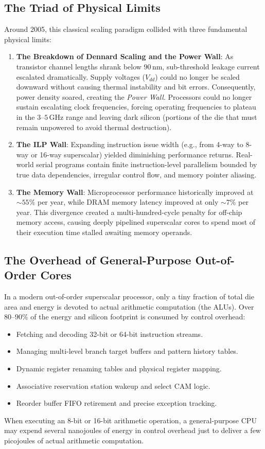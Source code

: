 \subsection{The Triad of Physical Limits}
Around 2005, this classical scaling paradigm collided with three fundamental physical limits:
\begin{enumerate}
    \item \textbf{The Breakdown of Dennard Scaling and the Power Wall}: As transistor channel lengths shrank below $90\,\text{nm}$, sub-threshold leakage current escalated dramatically. Supply voltages ($V_{dd}$) could no longer be scaled downward without causing thermal instability and bit errors. Consequently, power density soared, creating the \emph{Power Wall}. Processors could no longer sustain escalating clock frequencies, forcing operating frequencies to plateau in the $3\text{--}5\,\text{GHz}$ range and leaving dark silicon (portions of the die that must remain unpowered to avoid thermal destruction).
    
    \item \textbf{The ILP Wall}: Expanding instruction issue width (e.g., from 4-way to 8-way or 16-way superscalar) yielded diminishing performance returns. Real-world serial programs contain finite instruction-level parallelism bounded by true data dependencies, irregular control flow, and memory pointer aliasing.
    
    \item \textbf{The Memory Wall}: Microprocessor performance historically improved at $\sim 55\%$ per year, while DRAM memory latency improved at only $\sim 7\%$ per year. This divergence created a multi-hundred-cycle penalty for off-chip memory access, causing deeply pipelined superscalar cores to spend most of their execution time stalled awaiting memory operands.
\end{enumerate}

\subsection{The Overhead of General-Purpose Out-of-Order Cores}
In a modern out-of-order superscalar processor, only a tiny fraction of total die area and energy is devoted to actual arithmetic computation (the ALUs). Over $80\text{--}90\%$ of the energy and silicon footprint is consumed by control overhead:
\begin{itemize}
    \item Fetching and decoding 32-bit or 64-bit instruction streams.
    \item Managing multi-level branch target buffers and pattern history tables.
    \item Dynamic register renaming tables and physical register mapping.
    \item Associative reservation station wakeup and select CAM logic.
    \item Reorder buffer FIFO retirement and precise exception tracking.
\end{itemize}
When executing an 8-bit or 16-bit arithmetic operation, a general-purpose CPU may expend several nanojoules of energy in control overhead just to deliver a few picojoules of actual arithmetic computation.

